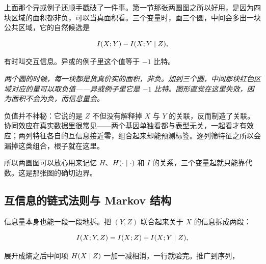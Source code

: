 上面那个异或例子还顺手戳破了一件事。第一节那张两圆图之所以好用，是因为四块区域的面积都非负，可以当真面积看。三个变量时，画三个圆，中间会多出一块公共区域，它的自然候选是

\[
I(X;Y)-I(X;Y\mid Z),
\]

有时叫交互信息。异或的例子里这个值等于 \(-1\) 比特。

\begin{center}

\emph{两个圆的时候，每一块都是货真价实的面积，非负。加到三个圆，中间那块红色区域对应的量可以取负值——异或例子里它是 \(-1\) 比特。图形直觉在这里失效，因为面积不会为负，而信息量会。}
\end{center}

负值并不神秘：它说的是 \(Z\) 不但没有解释掉 \(X\) 与 \(Y\) 的关联，反而制造了关联。协同效应在真实数据里很常见——两个基因单独看都与表型无关，一起看才有效应；两列特征各自的互信息接近零，组合起来却能预测标签。逐列筛特征之所以会漏掉这类组合，根子就在这里。

所以两圆图可以放心用来记忆 \(H\)、\(H(\cdot\mid\cdot)\) 和 \(I\) 的关系，三个变量起就只能靠代数。这是那张图的确切边界。

\subsection{互信息的链式法则与 Markov 结构}

信息量本身也能一段一段地拆。把 \((Y,Z)\) 联合起来关于 \(X\) 的信息拆成两段：

\[
I(X;Y,Z)=I(X;Z)+I(X;Y\mid Z),
\]

展开成熵之后中间项 \(H(X\mid Z)\) 一加一减相消，一行就验完。推广到序列，


